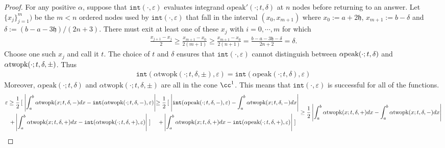 \documentclass{iitthesis}
\theoremstyle{definition}
\theoremstyle{remark}
\begin{document}
\begin{proof}
  For any positive $\alpha$, suppose that $\texttt{int}(\cdot,\varepsilon)$ evaluates integrand $\alpha\text{peak}'(\cdot;t,\delta)$ at $n$ nodes before returning to an answer. Let $\{x_j\}_{j=1}^{m})$ be the $m<n$ ordered nodes used by $\texttt{int}(\cdot,\varepsilon)$ that fall in the interval $(x_{0},x_{m+1})$ where $x_{0}:=a+2\mathfrak{h}$, $x_{m+1}:=b-\delta$ and $\delta:=(b-a-3\mathfrak{h})/(2n+3)$. There must exit at least one of these $x_{j}$ with $i=0,\cdots,m$ for which
  \begin{align*}
    \frac{x_{j+1}-x_{j}}{2}\ge\frac{x_{m+1}-x_{0}}{2(m+1)}\ge\frac{x_{m+1}-x_{0}}{2(n+1)}=\frac{b-a-3\mathfrak{h}-\delta}{2n+2}=\delta.
  \end{align*}
  Choose one such $x_{j}$ and call it $t$. The choice of $t$ and $\delta$ ensures that $\texttt{int}(\cdot,\varepsilon)$ cannot distinguish between $\alpha\textup{peak}(\cdot;t,\delta)$ and $\alpha\textup{twopk}(\cdot;t,\delta,\pm)$. Thus
  \begin{align*}
    \texttt{int}(\alpha\text{twopk}(\cdot;t,\delta,\pm),\varepsilon)=\texttt{int}(\alpha\text{peak}(\cdot;t,\delta),\varepsilon)
  \end{align*}
  Moreover, $\alpha\text{peak}(\cdot;t,\delta)$ and $\alpha\text{twopk}(\cdot;t,\delta,\pm)$ are all in the cone $\cc^1$. This means that $\texttt{int}(\cdot,\varepsilon)$ is successful for all of the functions.
  \begin{subequations}
  \begin{multline*}
    \varepsilon\ge\frac{1}{2}\left[\right.\left|\int_{a}^{b}\alpha\textup{twopk}(x;t,\delta,-)dx-\texttt{int}(\alpha\textup{twopk}(\cdot;t,\delta,-),\varepsilon)\right|\\
    +\left|\int_{a}^{b}\alpha\textup{twopk}(x;t,\delta,+)dx-\texttt{int}(\alpha\textup{twopk}(\cdot;t,\delta,+),\varepsilon)\right|\left.\right]
  \end{multline*}
  \begin{multline*}
    \ge\frac{1}{2}\left[\right.\left|\texttt{int}(\alpha\textup{peak}(\cdot;t,\delta,-),\varepsilon)-\int_{a}^{b}\alpha\textup{twopk}(x;t,\delta,-)dx\right|\\
    +\left|\int_{a}^{b}\alpha\textup{twopk}(x;t,\delta,+)dx-\texttt{int}(\alpha\textup{peak}(\cdot;t,\delta,+),\varepsilon)\right|\left.\right]
  \end{multline*}
  \begin{align*}
     &\ge\frac{1}{2}\left|\int_{a}^{b}\alpha\textup{twopk}(x;t,\delta,+)dx-\int_{a}^{b}\alpha\textup{twopk}(x;t,\delta,-)dx\right|\\

\end{align*}
\end{subequations}
\end{proof}
\end{document}
